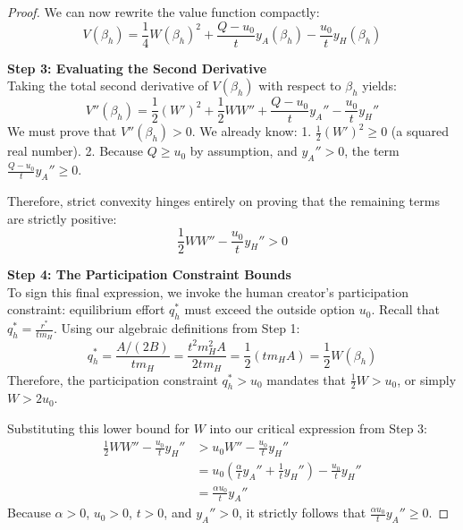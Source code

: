 \documentclass[mnsc,nonblindrev]{informs3_NoOR}
\begin{document}
\begin{proof}
We can now rewrite the value function compactly:
\begin{equation}
V(\beta_h) = \frac{1}{4} W(\beta_h)^2 + \frac{Q-u_0}{t} y_A(\beta_h) - \frac{u_0}{t} y_H(\beta_h)
\end{equation}

\vspace{0.5em}
\noindent\textbf{Step 3: Evaluating the Second Derivative} \\
Taking the total second derivative of $V(\beta_h)$ with respect to $\beta_h$ yields:
\begin{equation}
V''(\beta_h) = \frac{1}{2} (W')^2 + \frac{1}{2} W W'' + \frac{Q-u_0}{t} y_A'' - \frac{u_0}{t} y_H'' \label{eq:V_double_prime}
\end{equation}
We must prove that $V''(\beta_h) > 0$. We already know:
1. $\frac{1}{2} (W')^2 \ge 0$ (a squared real number).
2. Because $Q \ge u_0$ by assumption, and $y_A'' > 0$, the term $\frac{Q-u_0}{t} y_A'' \ge 0$.

Therefore, strict convexity hinges entirely on proving that the remaining terms are strictly positive:
\begin{equation}
\frac{1}{2} W W'' - \frac{u_0}{t} y_H'' > 0
\end{equation}

\vspace{0.5em}
\noindent\textbf{Step 4: The Participation Constraint Bounds} \\
To sign this final expression, we invoke the human creator's participation constraint: equilibrium effort $q_h^*$ must exceed the outside option $u_0$. 
Recall that $q_h^* = \frac{r^*}{t m_H}$. Using our algebraic definitions from Step 1:
\begin{equation*}
q_h^* = \frac{A / (2B)}{t m_H} = \frac{t^2 m_H^2 A}{2 t m_H} = \frac{1}{2} (t m_H A) = \frac{1}{2} W(\beta_h)
\end{equation*}
Therefore, the participation constraint $q_h^* > u_0$ mandates that $\frac{1}{2}W > u_0$, or simply $W > 2u_0$. 

Substituting this lower bound for $W$ into our critical expression from Step 3:
\begin{align*}
\frac{1}{2} W W'' - \frac{u_0}{t} y_H'' &> u_0 W'' - \frac{u_0}{t} y_H'' \\
&= u_0 \left( \frac{\alpha}{t} y_A'' + \frac{1}{t} y_H'' \right) - \frac{u_0}{t} y_H'' \\
&= \frac{\alpha u_0}{t} y_A''
\end{align*}
Because $\alpha > 0$, $u_0 > 0$, $t > 0$, and $y_A'' > 0$, it strictly follows that $\frac{\alpha u_0}{t} y_A'' \ge 0$.


\end{proof}
\end{document}
